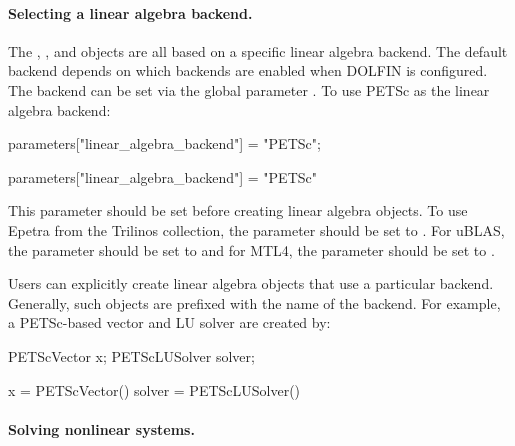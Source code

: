 \paragraph{Selecting a linear algebra backend.}

The , ,  and 
objects are all based on a specific linear algebra backend.
The default backend depends on which backends are enabled when DOLFIN
is configured.  The backend can be set via the global
parameter .  To use PETSc as the linear
algebra backend:
\begin{c++}
parameters["linear_algebra_backend"] = "PETSc";
\end{c++}
\begin{python}
parameters["linear_algebra_backend"] = "PETSc"
\end{python}
This parameter should be set before creating linear algebra
objects. To use Epetra from the Trilinos collection, the parameter
 should be set to .
For uBLAS, the parameter should be set to  and for MTL4, the
parameter should be set to .

Users can explicitly create linear algebra objects that use a
particular backend. Generally, such objects are prefixed with the name
of the backend. For example, a PETSc-based vector and LU solver are
created by:
\begin{c++}
PETScVector x;
PETScLUSolver solver;
\end{c++}
\begin{python}
x = PETScVector()
solver = PETScLUSolver()
\end{python}


\paragraph{Solving nonlinear systems.}


